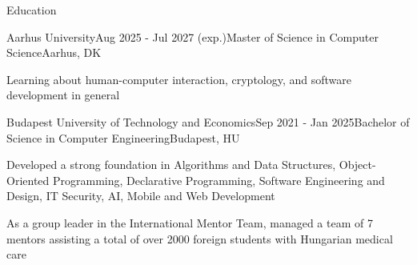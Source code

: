 \documentclass[
	a4paper, %
	11pt, %
]{resume} %
\begin{document}

\begin{rSection}{Education}

	\begin{rSubsection}{Aarhus University}{Aug 2025 - Jul 2027 (exp.)}{Master of Science in Computer Science}{Aarhus, DK}
		\item Learning about human-computer interaction, cryptology, and software development in general
	\end{rSubsection}

	\begin{rSubsection}{Budapest University of Technology and Economics}{Sep 2021 - Jan 2025}{Bachelor of Science in Computer Engineering}{Budapest, HU}
		\item Developed a strong foundation in Algorithms and Data Structures, Object-Oriented Programming, Declarative Programming, Software Engineering and Design, IT Security, AI, Mobile and Web Development
		\item As a group leader in the International Mentor Team, managed a team of 7 mentors assisting a total of over 2000 foreign students with Hungarian medical care
	\end{rSubsection}

\end{rSection}

\end{document}
